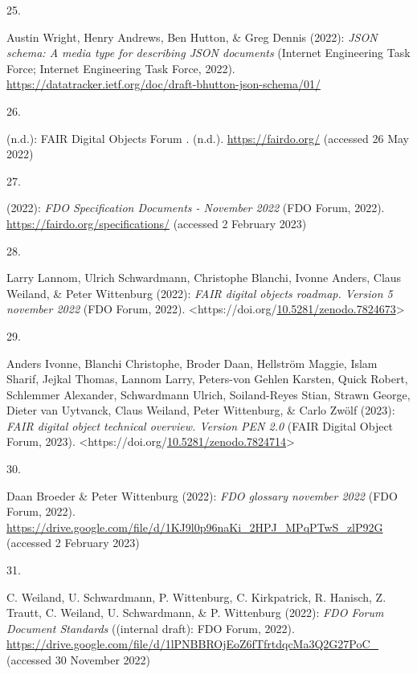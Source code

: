 \begin{thebibliography}{9}
\hypertarget{ref-Draftbhuttonjsonschema}{}
25.

Austin Wright, Henry Andrews, Ben Hutton, \& Greg Dennis (2022):
\emph{JSON schema: A media type for describing JSON documents} (Internet
Engineering Task Force; Internet Engineering Task Force, 2022).
\url{https://datatracker.ietf.org/doc/draft-bhutton-json-schema/01/}

\hypertarget{ref-FAIRDigitalObjects}{}
26.

(n.d.): {FAIR Digital Objects Forum} \textbar. (n.d.).
\url{https://fairdo.org/} (accessed 26 May 2022)

\hypertarget{ref-fdo-Specs}{}
27.

(2022): \emph{{FDO Specification Documents - November 2022}} ({FDO
Forum}, 2022). \url{https://fairdo.org/specifications/} (accessed 2
February 2023)

\hypertarget{ref-fdo-Roadmap}{}
28.

Larry Lannom, Ulrich Schwardmann, Christophe Blanchi, Ivonne Anders,
Claus Weiland, \& Peter Wittenburg (2022): \emph{FAIR digital objects
roadmap. Version 5 november 2022} ({FDO Forum}, 2022).
\textless https://doi.org/\href{https://doi.org/10.5281/zenodo.7824673}{10.5281/zenodo.7824673}\textgreater{}

\hypertarget{ref-fdo-Overview}{}
29.

Anders Ivonne, Blanchi Christophe, Broder Daan, Hellström Maggie, Islam
Sharif, Jejkal Thomas, Lannom Larry, Peters-von Gehlen Karsten, Quick
Robert, Schlemmer Alexander, Schwardmann Ulrich, Soiland-Reyes Stian,
Strawn George, Dieter van Uytvanck, Claus Weiland, Peter Wittenburg, \&
Carlo Zwölf (2023): \emph{{FAIR} digital object technical overview.
Version PEN 2.0} ({FAIR Digital Object Forum}, 2023).
\textless https://doi.org/\href{https://doi.org/10.5281/zenodo.7824714}{10.5281/zenodo.7824714}\textgreater{}

\hypertarget{ref-fdo-Glossary}{}
30.

Daan Broeder \& Peter Wittenburg (2022): \emph{{FDO} glossary november
2022} ({FDO Forum}, 2022).
\url{https://drive.google.com/file/d/1KJ9l0p96naKi_2HPJ_MPqPTwS_zlP92G}
(accessed 2 February 2023)

\hypertarget{ref-fdo-DocProcessStd}{}
31.

C. Weiland, U. Schwardmann, P. Wittenburg, C. Kirkpatrick, R. Hanisch,
Z. Trautt, C. Weiland, U. Schwardmann, \& P. Wittenburg (2022):
\emph{{FDO Forum Document Standards}} ({(internal draft)}: {FDO Forum},
2022).
\url{https://drive.google.com/file/d/1lPNBBROjEoZ6fTfrtdqcMa3Q2G27PoC_}
(accessed 30 November 2022)


\end{thebibliography}
